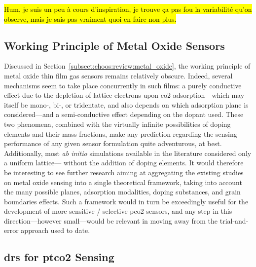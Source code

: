 \hl{Hum, je suis un peu à cours d'inspiration, je trouve ça pas fou la variabilité qu'on observe, mais je sais pas vraiment quoi en faire non plus.}

\subsection{Working Principle of Metal Oxide Sensors}

Discussed in Section~\ref{subsect:choos:review:metal_oxide}, the working principle of metal oxide thin film gas sensors remains relatively obscure. Indeed, several mechanisms seem to take place concurrently in such films: a purely conductive effect due to the depletion of lattice electrons upon \gls{co2} adsorption---which may itself be mono-, bi-, or tridentate\cite{usseinov2019}, and also depends on which adsorption plane is considered\cite{tang2013}---and a semi-conductive effect depending on the dopant used\cite{niu2004, sato2007, ra2010}. These two phenomena, combined with the virtually infinite possibilities of doping elements and their mass fractions, make any prediction regarding the sensing performance of any given sensor formulation quite adventurous, at best. Additionally, most \textit{ab initio} simulations available in the literature considered only a uniform lattice---\ie{} without the addition of doping elements. It would therefore be interesting to see further research aiming at aggregating the existing studies on metal oxide sensing into a single theoretical framework, taking into account the many possible planes, adsorption modalities, doping substances, and grain boundaries effects. Such a framework would in turn be exceedingly useful for the development of more sensitive / selective \gls{pco2} sensors, and any step in this direction---however small---would be relevant in moving away from the trial-and-error approach used to date.

\subsection{\texorpdfstring{\gls{drs} for \gls{ptco2} Sensing}{DRS for tcpCO2 Sensing}}

